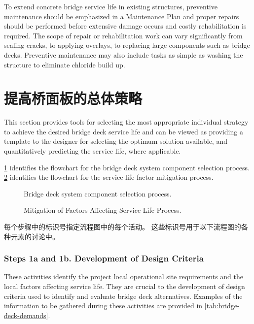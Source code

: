 To extend concrete bridge service life in existing structures, preventive maintenance should be emphasized in a Maintenance Plan and proper repairs should be performed before extensive damage occurs and costly rehabilitation is required. The scope of repair or rehabilitation work can vary significantly from sealing cracks, to applying overlays, to replacing large components such as bridge decks. Preventive maintenance may also include tasks as simple as washing the structure to eliminate chloride build up.

\section{提高桥面板的总体策略}
\label{sec:overall-strategy}

This section provides tools for selecting the most appropriate individual strategy to achieve the desired bridge deck service life and can be viewed as providing a template to the designer for selecting the optimum solution available, and quantitatively predicting the service life, where applicable.

\cref{fig:deck-selection-process} identifies the flowchart for the bridge deck system component selection process. \cref{fig:mitigation-process} identifies the flowchart for the service life factor mitigation process.

\begin{figure}
  \caption{Bridge deck system component selection process.}\label{fig:deck-selection-process}
\end{figure}

\begin{figure}
  \caption{Mitigation of Factors Affecting Service Life Process.}\label{fig:mitigation-process}
\end{figure}

每个步骤中的标识号指定流程图中的每个活动。 这些标识号用于以下流程图的各种元素的讨论中。

\subsubsection*{Steps 1a and 1b. Development of Design Criteria}
These activities identify the project local operational site requirements and the local factors affecting service life.  They are crucial to the development of design criteria used to identify and evaluate bridge deck alternatives.  Examples of the information to be gathered during these activities are provided in \cref{tab:bridge-deck-demands}.

